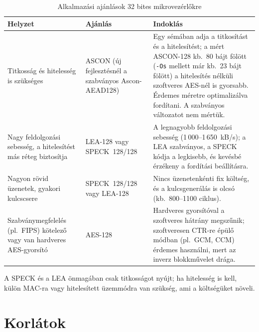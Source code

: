\documentclass[a4paper,12pt]{report}
\theoremstyle{definition}
\theoremstyle{remark}
\begin{document}
\begin{table}[htbp]
    \centering
    \small
    \caption{Alkalmazási ajánlások 32 bites mikrovezérlőkre}
    \label{tab:ajanlasok}
    \begin{tabularx}{\textwidth}{|p{4.2cm}|p{3.0cm}|X|}
        \hline
        \textbf{Helyzet} & \textbf{Ajánlás} & \textbf{Indoklás} \\ \hline
        Titkosság és hitelesség is szükséges & ASCON (új fejlesztésnél a szabványos Ascon-AEAD128) & Egy sémában adja a titkosítást és a hitelesítést; a mért ASCON-128 kb.\ 80 bájt fölött (\texttt{-Os} mellett már kb.\ 23 bájt fölött) a hitelesítés nélküli szoftveres AES-nél is gyorsabb. Érdemes méretre optimalizálva fordítani. A szabványos változatot nem mértük. \\ \hline
        Nagy feldolgozási sebesség, a hitelesítést más réteg biztosítja & LEA-128 vagy SPECK~128/128 & A legnagyobb feldolgozási sebesség (1\,000--1\,650~kB/s); a LEA szabványos, a SPECK kódja a legkisebb, és kevésbé érzékeny a fordítási beállításra. \\ \hline
        Nagyon rövid üzenetek, gyakori kulcscsere & SPECK~128/128 vagy LEA-128 & Nincs üzenetenkénti fix költség, és a kulcsgenerálás is olcsó (kb.\ 800--1100 ciklus). \\ \hline
        Szabványmegfelelés (pl.\ FIPS) kötelező vagy van hardveres AES-gyorsító & AES-128 & Hardveres gyorsítóval a szoftveres hátrány megszűnik; szoftveresen CTR-re épülő módban (pl.\ GCM, CCM) érdemes használni, mert az inverz blokkművelet drága. \\ \hline
    \end{tabularx}
\end{table}

A SPECK és a LEA önmagában csak titkosságot nyújt; ha hitelesség is kell, külön MAC-ra vagy hitelesített üzemmódra van szükség, ami a költségüket növeli.

\section{Korlátok}
\end{document}
